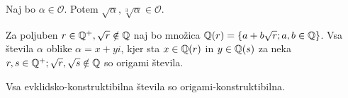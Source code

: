 \begin{trditev}
    Naj bo $\alpha \in \mathcal{O}$. Potem $\sqrt{\alpha}, \sqrt[3]{\alpha} \in \mathcal{O}$.
\end{trditev}
























\begin{izrek}
    \label{izr:origami_konstruktibilnost}
    Za poljuben $r \in \mathbb Q^{+}, \sqrt{r} \notin \mathbb Q$ naj bo množica $\mathbb Q(r) = \{a + b\sqrt{r}; a, b \in \mathbb Q\}$. Vsa števila $\alpha$ oblike $\alpha = x + y i$, kjer sta $x \in \mathbb Q(r)$ in $y \in \mathbb Q(s)$ za neka $r, s \in \mathbb Q^+; \sqrt{r}, \sqrt{s} \notin \mathbb Q$ so origami števila.
\end{izrek}

\begin{posledica}
    \label{posl:evkl_origami_konstruktibilnost}
    Vsa evklidsko-konstruktibilna števila so origami-konstruktibilna.
\end{posledica}

